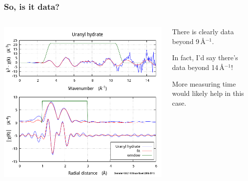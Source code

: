 \documentclass[10pt, xcolor=x11names, compress]{beamer}
\begin{document}
\begin{frame}
  \frametitle{So, is it data?}
  \begin{columns}
    \begin{column}{0.6\linewidth}
      \includegraphics[width=0.85\linewidth]{images/fit.png}
    \end{column}
    \begin{column}{0.4\linewidth}
      There is clearly data beyond 9\,\AA$^{-1}$.

      \medskip

      In fact, I'd say there's data beyond 14\,\AA$^{-1}$!

      \medskip

      More measuring time would likely help in this case.
    \end{column}
  \end{columns}
\end{frame}
\end{document}
